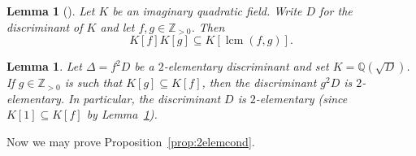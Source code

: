 \documentclass[12pt,a4paper,oneside]{amsart}
\newtheorem{lemma}[theorem]{Lemma}
\DeclareMathOperator{\lcm}{lcm}
\begin{document}
    \begin{lemma}[{\cite[Prop.~3.1]{AllombertBiluMadariaga15}}]\label{lem:compring}
		Let $K$ be an imaginary quadratic field. Write $D$ for the discriminant of $K$ and let $f, g \in \mathbb{Z}_{>0}$. Then
		\[ K[f] K[g] \subseteq K\left[\lcm\left(f, g\right)\right].\]
	\end{lemma}

	
	

\begin{lemma}\label{lem:2elemsub}
	Let $\Delta = f^2 D$ be a $2$-elementary discriminant and set $K = \mathbb{Q}(\sqrt{D})$. If $g \in \mathbb{Z}_{>0}$ is such that $K[g] \subseteq K[f]$, then the discriminant $g^2 D$ is $2$-elementary. In particular, the discriminant $D$ is $2$-elementary (since $K[1] \subseteq K[f]$ by Lemma~\ref{lem:compring}).
\end{lemma}



Now we may prove Proposition~\ref{prop:2elemcond}.
\end{document}
